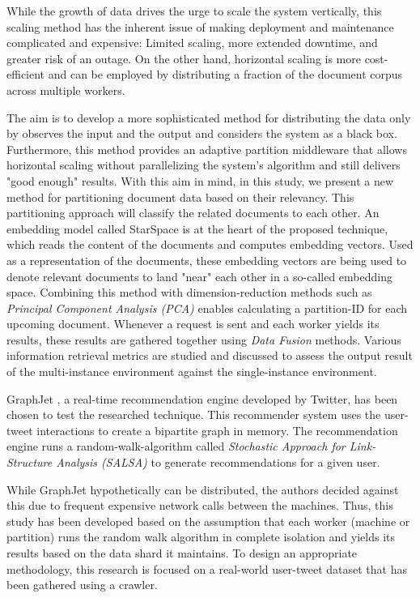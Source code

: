 While the growth of data drives the urge to scale the system vertically, this scaling method has the inherent issue of making deployment and maintenance complicated and expensive: Limited scaling, more extended downtime, and greater risk of an outage. On the other hand, horizontal scaling is more cost-efficient and can be employed by distributing a fraction of the document corpus across multiple workers.


The aim is to develop a more sophisticated method for distributing the data only by observes the input and the output and considers the system as a black box. Furthermore, this method provides an adaptive partition middleware that allows horizontal scaling without parallelizing the system's algorithm and still delivers "good enough" results. With this aim in mind, in this study, we present a new method for partitioning document data based on their relevancy. This partitioning approach will classify the related documents to each other. An embedding model called StarSpace is at the heart of the proposed technique, which reads the content of the documents and computes embedding vectors. Used as a representation of the documents, these embedding vectors are being used to denote relevant documents to land "near" each other in a so-called embedding space. Combining this method with dimension-reduction methods such as \emph{Principal Component Analysis (PCA)} \cite{woldPrincipalComponentAnalysis1987} enables calculating a partition-ID for each upcoming document. Whenever a request is sent and each worker yields its results, these results are gathered together using \emph{Data Fusion} methods. Various information retrieval metrics are studied and discussed to assess the output result of the multi-instance environment against the single-instance environment.


GraphJet \cite{sharmaGraphJetRealtimeContent2016}, a real-time recommendation engine developed by Twitter, has been chosen to test the researched technique. This recommender system uses the user-tweet interactions to create a bipartite graph in memory. The recommendation engine runs a random-walk-algorithm called \emph{Stochastic Approach for Link-Structure Analysis (SALSA)} \cite{lempelSALSAStochasticApproach2001} to generate recommendations for a given user. 


While GraphJet hypothetically can be distributed, the authors decided against this due to frequent expensive network calls between the machines. Thus, this study has been developed based on the assumption that each worker (machine or partition) runs the random walk algorithm in complete isolation and yields its results based on the data shard it maintains. To design an appropriate methodology, this research is focused on a real-world user-tweet dataset that has been gathered using a crawler. 


